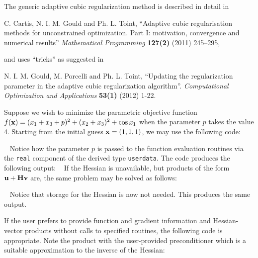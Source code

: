\documentclass{galahad}
\begin{document}
\galreferences
\vspace*{1mm}

\noindent
The generic adaptive cubic regularization method is described in detail in
\vspace*{1mm}

\noindent
C. Cartis,  N. I. M. Gould and Ph. L. Toint,
``Adaptive cubic regularisation methods for unconstrained optimization.
Part I: motivation, convergence and numerical results''
{\em Mathematical Programming} {\bf 127(2)} (2011) 245--295,
\vspace*{1mm}

\noindent
and uses ``tricks'' as suggested in
\vspace*{1mm}

\noindent
N. I. M. Gould, M. Porcelli and Ph. L. Toint,
``Updating the regularization parameter in the adaptive cubic regularization
algorithm''.
{\em Computational Optimization and Applications}
{\bf 53(1)} (2012) 1-22.


\galexamples
Suppose we wish to minimize the parametric objective function
$f({\mathbf{x}}) = ( x_1 + x_3 + p )^2 + ( x_2 + x_3 )^2 + \cos x_1$
when the parameter $p$ takes the value 4. Starting from the
initial guess ${\mathbf{x}} = (1,1,1)$,
we may use the following code:

{\tt \small
\VerbatimInput{\packageexample}
}
\noindent
Notice how the parameter $p$ is passed to the function evaluation
routines via the {\tt real} component of the derived type {\tt userdata}.
The code produces the following output:
{\tt \small
\VerbatimInput{\packageresults}
}
\noindent
If the Hessian is unavailable, but products of the form
${\mathbf{u}} + {\mathbf{H}} {\mathbf{v}}$ are, the same problem may be solved as follows:

{\tt \small
\VerbatimInput{\packageexampleb}
}
\noindent
Notice that storage for the Hessian is now not needed.
This produces the same output.

If the user prefers to provide function and gradient information and
Hessian-vector products
without calls to specified routines, the following code is appropriate.
Note the product with the user-provided preconditioner
which is a suitable approximation to the inverse of the Hessian:

{\tt \small
\VerbatimInput{\packageexamplec}
}
\noindent
\noindent
\end{document}
